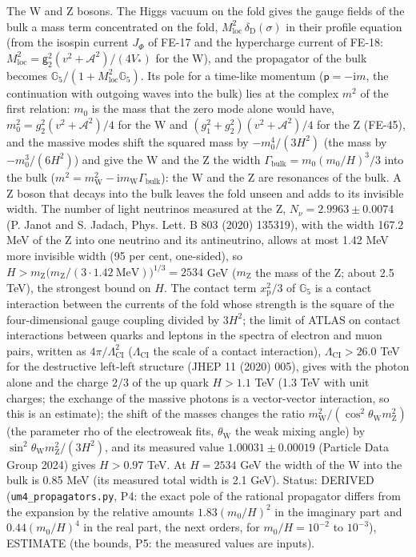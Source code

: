 \documentclass[
  10pt,
]{article}
\begin{document}
The W and Z bosons. The Higgs vacuum on the fold gives the gauge fields
of the bulk a mass term concentrated on the fold,
\(M_{\mathrm{loc}}^2\,\delta_{\mathrm{D}}(\sigma)\) in their profile
equation (from the isospin current \(J_\Phi\) of FE-17 and the
hypercharge current of FE-18:
\(M_{\mathrm{loc}}^2 = \mathsf{g}_2^2(v^2 + \mathcal{A}^2)/(4V_*)\) for
the W), and the propagator of the bulk becomes
\(\mathbb{G}_5/(1 + M_{\mathrm{loc}}^2\mathbb{G}_5)\). Its pole for a
time-like momentum (\(\mathsf{p} = -\mathrm{i}m\), the continuation with
outgoing waves into the bulk) lies at the complex \(m^2\) of the first
relation: \(m_0\) is the mass that the zero mode alone would have,
\(m_0^2 = g_2^2(v^2 + \mathcal{A}^2)/4\) for the W and
\((g_1^2 + g_2^2)(v^2 + \mathcal{A}^2)/4\) for the Z (FE-45), and the
massive modes shift the squared mass by \(-m_0^4/(3H^2)\) (the mass by
\(-m_0^3/(6H^2)\)) and give the W and the Z the width
\(\Gamma_{\mathrm{bulk}} = m_0(m_0/H)^3/3\) into the bulk
(\(m^2 = m_{\mathrm{W}}^2 - \mathrm{i}m_{\mathrm{W}}\Gamma_{\mathrm{bulk}}\)):
the W and the Z are resonances of the bulk. A Z boson that decays into
the bulk leaves the fold unseen and adds to its invisible width. The
number of light neutrinos measured at the Z,
\(N_\nu = 2.9963 \pm 0.0074\) (P. Janot and S. Jadach, Phys. Lett. B 803
(2020) 135319), with the width 167.2 MeV of the Z into one neutrino and
its antineutrino, allows at most 1.42 MeV more invisible width (95 per
cent, one-sided), so
\(H > m_{\mathrm{Z}}\big(m_{\mathrm{Z}}/(3\cdot1.42\ \mathrm{MeV})\big)^{1/3} = 2534\)
GeV (\(m_{\mathrm{Z}}\) the mass of the Z; about 2.5 TeV), the strongest
bound on \(H\). The contact term \(x_{\mathrm{p}}^2/3\) of
\(\mathbb{G}_5\) is a contact interaction between the currents of the
fold whose strength is the square of the four-dimensional gauge coupling
divided by \(3H^2\); the limit of ATLAS on contact interactions between
quarks and leptons in the spectra of electron and muon pairs, written as
\(4\pi/\Lambda_{\mathrm{CI}}^2\) (\(\Lambda_{\mathrm{CI}}\) the scale of
a contact interaction), \(\Lambda_{\mathrm{CI}} > 26.0\) TeV for the
destructive left-left structure (JHEP 11 (2020) 005), gives with the
photon alone and the charge \(2/3\) of the up quark \(H > 1.1\) TeV (1.3
TeV with unit charges; the exchange of the massive photons is a
vector-vector interaction, so this is an estimate); the shift of the
masses changes the ratio
\(m_{\mathrm{W}}^2/(\cos^2\theta_{\mathrm{W}}m_{\mathrm{Z}}^2)\) (the
parameter rho of the electroweak fits, \(\theta_{\mathrm{W}}\) the weak
mixing angle) by \(\sin^2\theta_{\mathrm{W}}m_{\mathrm{Z}}^2/(3H^2)\),
and its measured value \(1.00031 \pm 0.00019\) (Particle Data Group
2024) gives \(H > 0.97\) TeV. At \(H = 2534\) GeV the width of the W
into the bulk is 0.85 MeV (its measured total width is 2.1 GeV). Status:
DERIVED (\texttt{um4\_propagators.py}, P4: the exact pole of the
rational propagator differs from the expansion by the relative amounts
\(1.83(m_0/H)^2\) in the imaginary part and \(0.44(m_0/H)^4\) in the
real part, the next orders, for \(m_0/H = 10^{-2}\) to \(10^{-3}\)),
ESTIMATE (the bounds, P5: the measured values are inputs).
\end{document}

